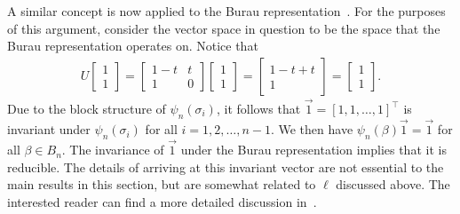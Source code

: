 A similar concept is now applied to the Burau representation~\cite{Delaney2016}. For the purposes of this argument, consider the vector space in question to be the space that the Burau representation operates on. Notice that
\begin{align}
    U\begin{bmatrix}
        1\\1
    \end{bmatrix} = \begin{bmatrix}
        1-t & t \\ 1 & 0
    \end{bmatrix}\begin{bmatrix}
        1\\1
    \end{bmatrix} = \begin{bmatrix}
        1-t+t \\ 1
    \end{bmatrix} = \begin{bmatrix}
        1 \\ 1
    \end{bmatrix}.
\end{align}
Due to the block structure of $\psi_n(\sigma_i)$, it follows that $\vec{1}=[1,1,\dots,1]^\top$ is invariant under $\psi_n(\sigma_i)$ for all $i=1,2,\dots,n-1$. We then have $\psi_n(\beta)\vec{1}=\vec{1}$ for all $\beta\in B_n$. The invariance of $\vec{1}$ under the Burau representation implies that it is reducible. The details of arriving at this invariant vector are not essential to the main results in this section, but are somewhat related to $\ell$ discussed above. The interested reader can find a more detailed discussion in~\cite{Delaney2016}.

